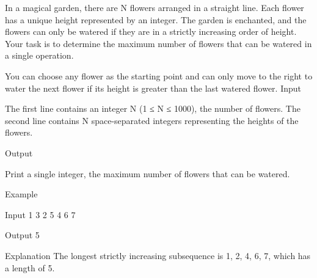 
In a magical garden, there are N flowers arranged in a straight line. Each flower has a unique height represented by an integer. The garden is enchanted, and the flowers can only be watered if they are in a strictly increasing order of height. Your task is to determine the maximum number of flowers that can be watered in a single operation.

You can choose any flower as the starting point and can only move to the right to water the next flower if its height is greater than the last watered flower.
Input

    The first line contains an integer N (1 ≤ N ≤ 1000), the number of flowers.
    The second line contains N space-separated integers representing the heights of the flowers.

Output

    Print a single integer, the maximum number of flowers that can be watered.

Example

Input
1 3 2 5 4 6 7

Output
5

Explanation
The longest strictly increasing subsequence is 1, 2, 4, 6, 7, which has a length of 5.

